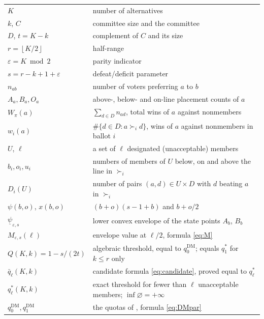 \documentclass[11pt]{article}
\theoremstyle{plain}
\theoremstyle{definition}
\newcommand{\fl}[1]{\left\lfloor #1\right\rfloor}
\newcommand{\eps}{\varepsilon}
\newcommand{\DM}{\mathrm{DM}}
\newcommand{\uw}{\underline{\psi}}
\begin{document}
\begin{center}
\begin{tabular}{>{\raggedright\arraybackslash}p{}>{\raggedright\arraybackslash}p{}}
\toprule
$K$ & number of alternatives\\
$k$, $C$ & committee size and the committee\\
$D$, $t=K-k$ & complement of $C$ and its size\\
$r=\fl{K/2}$ & half-range\\
$\eps=K\bmod 2$ & parity indicator\\
$s=r-k+1+\eps$ & defeat/deficit parameter\\
$n_{ab}$ & number of voters preferring $a$ to $b$\\
$A_a,B_a,O_a$ & above-, below- and on-line placement counts of $a$\\
$W_\pi(a)$ & $\sum_{d\in D}n_{ad}$, total wins of $a$ against nonmembers\\
$w_i(a)$ & $\#\{d\in D: a\succ_i d\}$, wins of $a$ against nonmembers in ballot $i$\\
$U$, $\ell$ & a set of $\ell$ designated (unacceptable) members\\
$b_i,o_i,u_i$ & numbers of members of $U$ below, on and above the line in $\succ_i$\\
$D_i(U)$ & number of pairs $(a,d)\in U\times D$ with $d$ beating $a$ in $\succ_i$\\
$\psi(b,o)$, $x(b,o)$ & $(b+o)(s-1+b)$ and $b+o/2$\\
$\uw_{\eps,s}$ & lower convex envelope of the state points $A_b$, $B_b$\\
$M_{\eps,s}(\ell)$ & envelope value at $\ell/2$, formula \eqref{eq:M}\\
$Q(K,k)=1-s/(2t)$ & algebraic threshold, equal to $q_0^{\DM}$; equals $q_1^*$ for $k\le r$ only\\
$\bar q_\ell(K,k)$ & candidate formula \eqref{eq:candidate}, proved equal to $q_\ell^*$\\
$q_\ell^*(K,k)$ & exact threshold for fewer than $\ell$ unacceptable members; $\inf\varnothing=+\infty$\\
$q_0^{\DM},q_1^{\DM}$ & the quotas of \cite{DissMahajne2020}, formula \eqref{eq:DMpar}\\
\bottomrule
\end{tabular}
\end{center}
\end{document}
